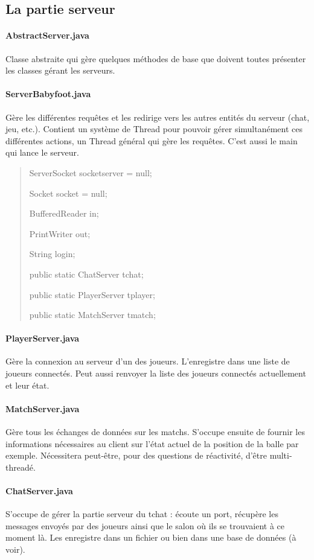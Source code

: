 \documentclass[a4paper,12pt]{report}
\begin{document}
\subsection{La partie serveur}
\paragraph{AbstractServer.java}
Classe abstraite qui gère quelques méthodes de base que doivent toutes présenter les classes gérant les serveurs.
\paragraph{ServerBabyfoot.java}
Gère les différentes requêtes et les redirige vers les autres entités du serveur (chat, jeu, etc.). Contient un système de Thread pour pouvoir gérer simultanément ces différentes actions, un Thread général qui gère les requêtes. C'est aussi le main qui lance le serveur.
\begin{quote}
    ServerSocket socketserver = null;
    
	Socket socket = null;
    
	BufferedReader in;
    
	PrintWriter out;
    
	String login;
    
	public static ChatServer tchat;
    
	public static PlayerServer tplayer;
    
	public static MatchServer tmatch;
\end{quote}
\paragraph{PlayerServer.java}
Gère la connexion au serveur d'un des joueurs. L'enregistre dans une liste de joueurs connectés. Peut aussi renvoyer la liste des joueurs connectés actuellement et leur état.
\paragraph{MatchServer.java}
Gère tous les échanges de données sur les matchs. S'occupe ensuite de fournir les informations nécessaires au client sur l'état actuel de la position de la balle par exemple. Nécessitera peut-être, pour des questions de réactivité, d'être multi-threadé.
\paragraph{ChatServer.java}
S'occupe de gérer la partie serveur du tchat : écoute un port, récupère les messages envoyés par des joueurs ainsi que le salon où ils se trouvaient à ce moment là. Les enregistre dans un fichier ou bien dans une base de données (à voir).
\end{document}
